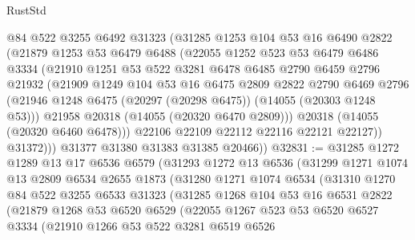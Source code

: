 \begin{lexlean}{RustStd}
\begin{coremodule}
            @84
            @522
            @3255
            @6492
            @31323
            (@31285
              @1253
              @104
              @53
              @16
              @6490
              @2822
              (@21879
                @1253
                @53
                @6479
                @6488
                (@22055
                  @1252
                  @523
                  @53
                  @6479
                  @6486
                  @3334
                  (@21910
                    @1251
                    @53
                    @522
                    @3281
                    @6478
                    @6485
                    @2790
                    @6459
                    @2796
                    @21932
                    (@21909
                      @1249
                      @104
                      @53
                      @16
                      @6475
                      @2809
                      @2822
                      @2790
                      @6469
                      @2796
                      (@21946 @1248 @6475 (@20297 (@20298 @6475)) (@14055 (@20303 @1248 @53)))
                      @21958
                      @20318
                      (@14055 (@20320 @6470 @2809)))
                    @20318
                    (@14055 (@20320 @6460 @6478)))
                  @22106
                  @22109
                  @22112
                  @22116
                  @22121
                  @22127))
              @31372)))
        @31377
        @31380
        @31383
        @31385
        @20466))
@32831 := @31285
    @1272
    @1289
    @13
    @17
    @6536
    @6579
    (@31293
      @1272
      @13
      @6536
      (@31299
        @1271
        @1074
        @13
        @2809
        @6534
        @2655
        @1873
        (@31280
          @1271
          @1074
          @6534
          (@31310
            @1270
            @84
            @522
            @3255
            @6533
            @31323
            (@31285
              @1268
              @104
              @53
              @16
              @6531
              @2822
              (@21879
                @1268
                @53
                @6520
                @6529
                (@22055
                  @1267
                  @523
                  @53
                  @6520
                  @6527
                  @3334
                  (@21910
                    @1266
                    @53
                    @522
                    @3281
                    @6519
                    @6526

\end{coremodule}
\end{lexlean}
